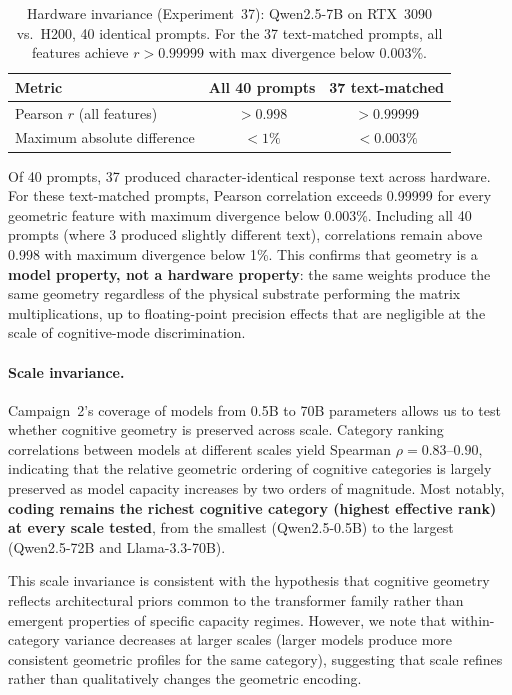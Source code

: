 \begin{table}[t]
  \centering
  \caption{Hardware invariance (Experiment~37): Qwen2.5-7B on RTX~3090 vs.\ H200, 40 identical prompts.
  For the 37 text-matched prompts, all features achieve $r > 0.99999$ with max divergence below 0.003\%.}
  \label{tab:hardware_invariance}
  \begin{tabular}{@{}lcc@{}}
    \toprule
    Metric & All 40 prompts & 37 text-matched \\
    \midrule
    Pearson $r$ (all features)    & $> 0.998$ & $> 0.99999$ \\
    Maximum absolute difference   & $< 1\%$   & $< 0.003\%$ \\
    \bottomrule
  \end{tabular}
\end{table}

\noindent Of 40 prompts, 37 produced character-identical response text across hardware.
For these text-matched prompts, Pearson correlation exceeds 0.99999 for every geometric feature with maximum divergence below 0.003\%.
Including all 40 prompts (where 3 produced slightly different text), correlations remain above 0.998 with maximum divergence below 1\%.
This confirms that \kvcache geometry is a \textbf{model property, not a hardware property}: the same weights produce the same geometry regardless of the physical substrate performing the matrix multiplications, up to floating-point precision effects that are negligible at the scale of cognitive-mode discrimination.

\paragraph{Scale invariance.}
Campaign~2's coverage of models from 0.5B to 70B parameters allows us to test whether cognitive geometry is preserved across scale.
Category ranking correlations between models at different scales yield Spearman $\rho = 0.83$--$0.90$, indicating that the relative geometric ordering of cognitive categories is largely preserved as model capacity increases by two orders of magnitude.
Most notably, \textbf{coding remains the richest cognitive category (highest effective rank) at every scale tested}, from the smallest (Qwen2.5-0.5B) to the largest (Qwen2.5-72B and Llama-3.3-70B).

This scale invariance is consistent with the hypothesis that cognitive geometry reflects architectural priors common to the transformer family rather than emergent properties of specific capacity regimes.
However, we note that within-category variance decreases at larger scales (larger models produce more consistent geometric profiles for the same category), suggesting that scale refines rather than qualitatively changes the geometric encoding.


